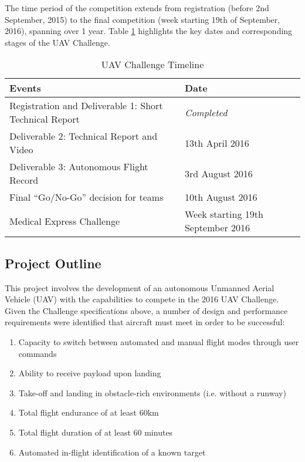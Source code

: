 The time period of the competition extends from registration (before 2nd September, 2015) to the final competition (week starting 19th of September, 2016), spanning over 1 year. Table \ref{tab:challenge} highlights the key dates and corresponding stages of the UAV Challenge.\\

\begin{table}[!ht]
	\caption{UAV Challenge Timeline}
	\label{tab:challenge}
	\centering
	\begin{tabular}{ | l | l | }
		\hline
		\textbf{Events} & \textbf{Date} \\ \hline \hline
		Registration and Deliverable 1: Short Technical Report & \textit{Completed} \\ \hline
		Deliverable 2: Technical Report and Video & 13th April 2016 \\ \hline
		Deliverable 3: Autonomous Flight Record & 3rd August 2016 \\ \hline
		Final ``Go/No-Go'' decision for teams & 10th August 2016 \\ \hline
		Medical Express Challenge & Week starting 19th September 2016 \\
		\hline
	\end{tabular}
\end{table}

\subsection{Project Outline}
This project involves the development of an autonomous Unmanned Aerial Vehicle (UAV) with the capabilities to compete in the 2016 UAV Challenge. Given the Challenge specifications above, a number of design and performance requirements were identified that aircraft must meet in order to be successful:
\begin{enumerate}[label=\bfseries R\arabic*:] \itemsep-2pt
	\item Capacity to switch between automated and manual flight modes through user commands
	\item Ability to receive payload upon landing
	\item Take-off and landing in obstacle-rich environments (i.e. without a runway)
	\item Total flight endurance of at least 60km
	\item Total flight duration of at least 60 minutes
	\item Automated in-flight identification of a known target
\end{enumerate}

